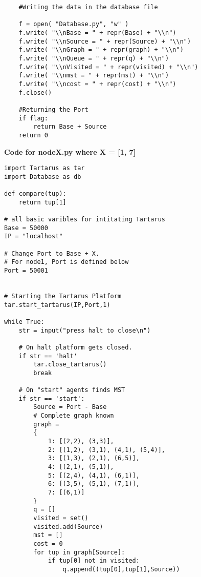 \documentclass[12t]{csethesis}
\begin{document}
\begin{appendices}
\begin{lstlisting}
    #Writing the data in the database file
    
    f = open( "Database.py", "w" ) 
    f.write( "\\nBase = " + repr(Base) + "\\n") 
    f.write( "\\nSource = " + repr(Source) + "\\n")
    f.write( "\\nGraph = " + repr(graph) + "\\n")
    f.write( "\\nQueue = " + repr(q) + "\\n")
    f.write( "\\nVisited = " + repr(visited) + "\\n")
    f.write( "\\nmst = " + repr(mst) + "\\n")
    f.write( "\\ncost = " + repr(cost) + "\\n")
    f.close()
       
    #Returning the Port
    if flag:
        return Base + Source  
    return 0 

\end{lstlisting}
\clearpage
\textbf{Code for nodeX.py where X = [1, 7]}
\begin{lstlisting}
import Tartarus as tar
import Database as db

def compare(tup):
    return tup[1]

# all basic varibles for intitating Tartarus
Base = 50000
IP = "localhost"

# Change Port to Base + X.
# For node1, Port is defined below
Port = 50001


# Starting the Tartarus Platform
tar.start_tartarus(IP,Port,1)

while True:
    str = input("press halt to close\n")
    
    # On halt platform gets closed.
    if str == 'halt'
        tar.close_tartarus()
        break

    # On "start" agents finds MST
    if str == 'start':
        Source = Port - Base
        # Complete graph known
        graph = 
        {
            1: [(2,2), (3,3)],
            2: [(1,2), (3,1), (4,1), (5,4)],
            3: [(1,3), (2,1), (6,5)],
            4: [(2,1), (5,1)],
            5: [(2,4), (4,1), (6,1)],
            6: [(3,5), (5,1), (7,1)],
            7: [(6,1)]
        }
        q = []
        visited = set()
        visited.add(Source)
        mst = []
        cost = 0 
        for tup in graph[Source]:
            if tup[0] not in visited:
                q.append((tup[0],tup[1],Source))
        

\end{lstlisting}
\end{appendices}
\end{document}
